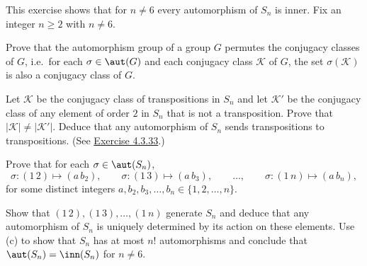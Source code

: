 \begin{specialexercise}
	This exercise shows that for $n\neq 6$ every automorphism of $S_n$ is inner. Fix an integer $n\ge 2$ with $n\neq 6$.
	\begin{subproblems}
		\item Prove that the automorphism group of a group $G$ permutes the conjugacy classes of $G$, i.e.\ for each $\sigma\in\aut(G)$ and each conjugacy class $\mathcal K$ of $G$, the set $\sigma(\mathcal K)$ is also a conjugacy class of $G$.
		\item Let $\mathcal K$ be the conjugacy class of transpositions in $S_n$ and let $\mathcal K'$ be the conjugacy class of any element of order $2$ in $S_n$ that is not a transposition. Prove that $|\mathcal K|\neq|\mathcal K'|$. Deduce that any automorphism of $S_n$ sends transpositions to transpositions. (See \hyperref[ex4.3.33]{Exercise 4.3.33}.)
		\item Prove that for each $\sigma\in\aut(S_n)$,
		\[
		\sigma:(1\,2)\mapsto(a\,b_2),\qquad \sigma:(1\,3)\mapsto(a\,b_3),\qquad \ldots,\qquad \sigma:(1\,n)\mapsto(a\,b_n),
		\]
		for some distinct integers $a,b_2,b_3,\ldots,b_n\in\{1,2,\ldots,n\}$.
		\item Show that $(1\,2),(1\,3),\ldots,(1\,n)$ generate $S_n$ and deduce that any automorphism of $S_n$ is uniquely determined by its action on these elements. Use (c) to show that $S_n$ has at most $n!$ automorphisms and conclude that $\aut(S_n)=\inn(S_n)$ for $n\neq 6$.
	\end{subproblems}
\end{specialexercise}

